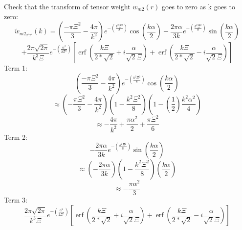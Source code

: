 \documentclass[letterpaper,twocolumn,amsmath,amssymb,prb]{revtex4-1}
\begin{document}
\begin{widetext}
\[{}\]
\noindent Check that the transform of tensor weight ${w}_{m2}(r)$ goes to zero as k goes to zero:
\begin{displaymath}{\widetilde{w}_{{m2}_{x'x'}}(k)=\left(\frac{-\pi\Xi^2}{3}-\frac{4\pi}{k^2}\right)e^{-\left(\frac{k^2\Xi^2}{8}\right)}\cos(\frac{k\alpha}{2})-\frac{2\pi\alpha}{3k}e^{-\left(\frac{k^2\Xi^2}{8}\right)}\sin(\frac{k\alpha}{2})}\end{displaymath} 
\begin{equation}{+\frac{2\pi\sqrt{2\pi}}{k^3\Xi}e^{-\left(\frac{\alpha^2}{2\Xi^2}\right)}\left[\operatorname{erf}\left(\frac{k\Xi}{2*\sqrt{2}}+i\frac{\alpha}{\sqrt{2}\Xi}\right)+\operatorname{erf}\left(\frac{k\Xi}{2*\sqrt{2}}-i\frac{\alpha}{\sqrt{2}\Xi}\right)\right]}\end{equation}
Term 1: 
\begin{equation}{\left(\frac{-\pi\Xi^2}{3}-\frac{4\pi}{k^2}\right)e^{-\left(\frac{k^2\Xi^2}{8}\right)}\cos(\frac{k\alpha}{2})}\end{equation}
\begin{displaymath}{\approx\left(-\frac{\pi\Xi^2}{3}-\frac{4\pi}{k^2}\right)\left(1-\frac{k^2\Xi^2}{8}\right)\left(1-\left(\frac{1}{2}\right)\frac{k^2\alpha^2}{4}\right)}\end{displaymath} 
\begin{displaymath}{\approx-\frac{4\pi}{k^2}+\frac{\pi\alpha^2}{2}+\frac{\pi\Xi^2}{6}}\end{displaymath} 
Term 2:
\begin{equation}{-\frac{2\pi\alpha}{3k}e^{-\left(\frac{k^2\Xi^2}{8}\right)}\sin(\frac{k\alpha}{2})}\end{equation} 
\begin{displaymath}{\approx\left(-\frac{2\pi\alpha}{3k}\right)\left(1-\frac{k^2\Xi^2}{8}\right)\left(\frac{k\alpha}{2}\right)}\end{displaymath} 
\begin{displaymath}{\approx}-\frac{\pi\alpha^2}{3}\end{displaymath}
Term 3:
\begin{equation}{\frac{2\pi\sqrt{2\pi}}{k^3\Xi}e^{-\left(\frac{\alpha^2}{2\Xi^2}\right)}\left[\operatorname{erf}\left(\frac{k\Xi}{2*\sqrt{2}}+i\frac{\alpha}{\sqrt{2}\Xi}\right)+\operatorname{erf}\left(\frac{k\Xi}{2*\sqrt{2}}-i\frac{\alpha}{\sqrt{2}\Xi}\right)\right]}\end{equation}

\end{widetext}
\end{document}
